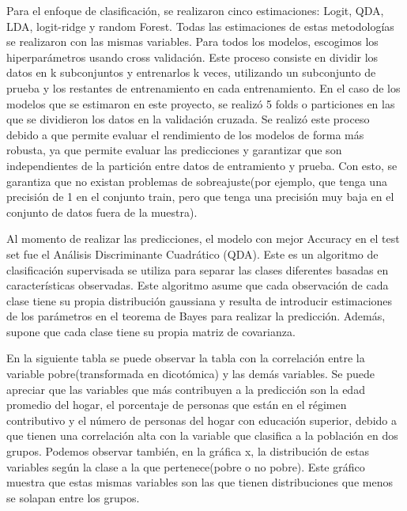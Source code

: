 \documentclass[
  11pt,
  letterpaper,
]{article}
\begin{document}
Para el enfoque de clasificación, se realizaron cinco estimaciones: Logit, QDA, LDA, logit-ridge y random Forest. Todas las estimaciones de estas metodologías se realizaron con las mismas variables. Para todos los modelos, escogimos los hiperparámetros usando cross validación. Este proceso consiste en dividir los datos en k subconjuntos y entrenarlos k veces, utilizando un subconjunto de prueba y los restantes de entrenamiento en cada entrenamiento. En el caso de los modelos que se estimaron en este proyecto, se realizó 5 folds o particiones en las que se dividieron los datos en la validación cruzada. Se realizó este proceso debido a que permite evaluar el rendimiento de los modelos de forma más robusta, ya que permite evaluar las predicciones y garantizar que son independientes de la partición entre datos de entramiento y prueba. Con esto, se garantiza que no existan problemas de sobreajuste(por ejemplo, que tenga una precisión de 1 en el conjunto train, pero que tenga una precisión muy baja en el conjunto de datos fuera de la muestra).

Al momento de realizar las predicciones, el modelo con mejor Accuracy en el test set fue el Análisis Discriminante Cuadrático (QDA). Este es un algoritmo de clasificación supervisada se utiliza para separar las clases diferentes basadas en características observadas. Este algoritmo asume que cada observación de cada clase tiene su propia distribución gaussiana y resulta de introducir estimaciones de los parámetros en el teorema de Bayes para realizar la predicción. Además, supone que cada clase tiene su propia matriz de covarianza.

En la siguiente tabla se puede observar la tabla con la correlación entre la variable pobre(transformada en dicotómica) y las demás variables. Se puede apreciar que las variables que más contribuyen a la predicción son la edad promedio del hogar, el porcentaje de personas que están en el régimen contributivo y el número de personas del hogar con educación superior, debido a que tienen una correlación alta con la variable que clasifica a la población en dos grupos. Podemos observar también, en la gráfica x, la distribución de estas variables según la clase a la que pertenece(pobre o no pobre). Este gráfico muestra que estas mismas variables son las que tienen distribuciones que menos se solapan entre los grupos.
\end{document}
